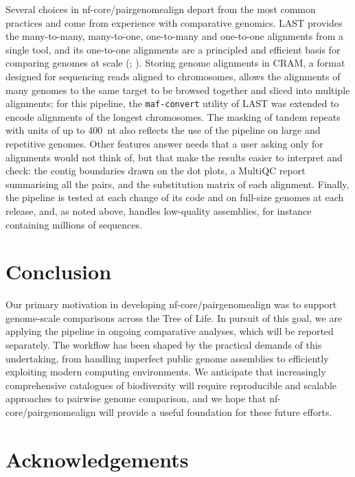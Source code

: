 \documentclass[PCJ,Unicode,screen]{cedram}
\begin{document}
Several choices in nf-core/pairgenomealign depart from the most common practices and come from experience with comparative genomics. LAST provides the many-to-many, many-to-one, one-to-many and one-to-one alignments from a single tool, and its one-to-one alignments are a principled and efficient basis for comparing genomes at scale (\cite{Frith_2015}; \cite{Plessy_2024}). Storing genome alignments in CRAM, a format designed for sequencing reads aligned to chromosomes, allows the alignments of many genomes to the same target to be browsed together and sliced into multiple alignments; for this pipeline, the \texttt{maf-convert} utility of LAST was extended to encode alignments of the longest chromosomes. The masking of tandem repeats with units of up to 400~nt also reflects the use of the pipeline on large and repetitive genomes. Other features answer needs that a user asking only for alignments would not think of, but that make the results easier to interpret and check: the contig boundaries drawn on the dot plots, a MultiQC report summarising all the pairs, and the substitution matrix of each alignment. Finally, the pipeline is tested at each change of its code and on full-size genomes at each release, and, as noted above, handles low-quality assemblies, for instance containing millions of sequences.

\section*{Conclusion}

Our primary motivation in developing nf-core/pairgenomealign was to support genome-scale comparisons across the Tree of Life. In pursuit of this goal, we are applying the pipeline in ongoing comparative analyses, which will be reported separately. The workflow has been shaped by the practical demands of this undertaking, from handling imperfect public genome assemblies to efficiently exploiting modern computing environments. We anticipate that increasingly comprehensive catalogues of biodiversity will require reproducible and scalable approaches to pairwise genome comparison, and we hope that nf-core/pairgenomealign will provide a useful foundation for these future efforts.

\section*{Acknowledgements}
\end{document}
